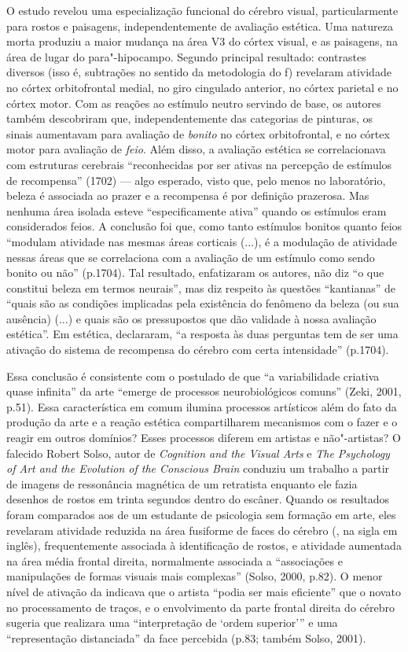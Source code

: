 O estudo revelou uma especialização funcional do cérebro visual,
particularmente para rostos e paisagens, independentemente de avaliação
estética. Uma natureza morta produziu a maior mudança na área V3 do
córtex visual, e as paisagens, na área de lugar do para"-hipocampo.
Segundo principal resultado: contrastes diversos (isso é, subtrações no
sentido da metodologia do f) revelaram atividade no córtex
orbitofrontal medial, no giro cingulado anterior, no córtex parietal e
no córtex motor. Com as reações ao estímulo neutro servindo de base, os
autores também descobriram que, independentemente das categorias de
pinturas, os sinais aumentavam para avaliação de \emph{bonito} no córtex
orbitofrontal, e no córtex motor para avaliação de \emph{feio}. Além
disso, a avaliação estética se correlacionava com estruturas cerebrais
``reconhecidas por ser ativas na percepção de estímulos de recompensa''
(1702) --- algo esperado, visto que, pelo menos no laboratório, beleza é
associada ao prazer e a recompensa é por definição prazerosa. Mas
nenhuma área isolada esteve ``especificamente ativa'' quando os
estímulos eram considerados feios. A conclusão foi que, como tanto
estímulos bonitos quanto feios ``modulam atividade nas mesmas áreas
corticais (...), é a modulação de atividade nessas áreas que se
correlaciona com a avaliação de um estímulo como sendo bonito ou não''
(p.1704). Tal resultado, enfatizaram os autores, não diz ``o que
constitui beleza em termos neurais'', mas diz respeito às questões
``kantianas'' de ``quais são as condições implicadas pela existência do
fenômeno da beleza (ou sua ausência) (...) e quais são os pressupostos
que dão validade à nossa avaliação estética''. Em estética, declararam,
``a resposta às duas perguntas tem de ser uma ativação do sistema de
recompensa do cérebro com certa intensidade'' (p.1704).

Essa conclusão é consistente com o postulado de que ``a variabilidade
criativa quase infinita'' da arte ``emerge de processos neurobiológicos
comuns'' (Zeki, 2001, p.51). Essa característica em comum ilumina
processos artísticos além do fato da produção da arte e a reação
estética compartilharem mecanismos com o fazer e o reagir em outros
domínios? Esses processos diferem em artistas e não"-artistas? O falecido
Robert Solso, autor de \emph{Cognition and the Visual Arts} e \emph{The
Psychology of Art and the Evolution of the Conscious Brain} conduziu um
trabalho a partir de imagens de ressonância magnética de um retratista
enquanto ele fazia desenhos de rostos em trinta segundos dentro do
escâner. Quando os resultados foram comparados aos de um estudante de
psicologia sem formação em arte, eles revelaram atividade reduzida na
área fusiforme de faces do cérebro (, na sigla em inglês),
frequentemente associada à identificação de rostos, e atividade
aumentada na área média frontal direita, normalmente associada a
``associações e manipulações de formas visuais mais complexas'' (Solso,
2000, p.82). O menor nível de ativação da  indicava que o artista
``podia ser mais eficiente'' que o novato no processamento de traços, e
o envolvimento da parte frontal direita do cérebro sugeria que realizara
uma ``interpretação de `ordem superior''' e uma ``representação
distanciada'' da face percebida (p.83; também Solso, 2001).

